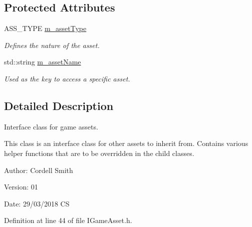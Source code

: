 \subsection*{Protected Attributes}
\begin{CompactItemize}
\item 
\hypertarget{class_i_game_asset_076aef4c07705e50ee4bfca6e16db742}{
ASS\_\-TYPE \hyperlink{class_i_game_asset_076aef4c07705e50ee4bfca6e16db742}{m\_\-assetType}}
\label{class_i_game_asset_076aef4c07705e50ee4bfca6e16db742}

\begin{CompactList}\small\item\em Defines the nature of the asset. \item\end{CompactList}\item 
\hypertarget{class_i_game_asset_cdc07b73c5cade61a1a38fa515576716}{
std::string \hyperlink{class_i_game_asset_cdc07b73c5cade61a1a38fa515576716}{m\_\-assetName}}
\label{class_i_game_asset_cdc07b73c5cade61a1a38fa515576716}

\begin{CompactList}\small\item\em Used as the key to access a specific asset. \item\end{CompactList}\end{CompactItemize}


\subsection{Detailed Description}
Interface class for game assets. 

This class is an interface class for other assets to inherit from. Contains various helper functions that are to be overridden in the child classes.

\begin{Desc}
\item[Author:]Cordell Smith \end{Desc}
\begin{Desc}
\item[Version:]01 \end{Desc}
\begin{Desc}
\item[Date:]29/03/2018 CS \end{Desc}


Definition at line 44 of file IGameAsset.h.

